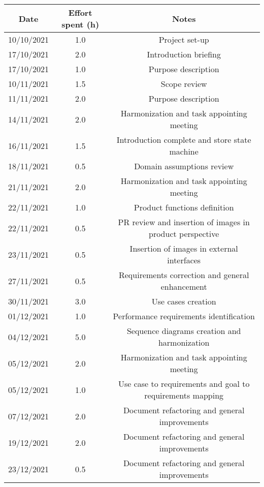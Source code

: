 \documentclass[../../main.tex]{subfiles}
\begin{document}
    \begin{center}
        \begin{tabular}{|c| |c| |c|} 
            \hline
            Date & Effort spent (h) & Notes\\ [0.5ex] 
            \hline\hline
            10/10/2021 & 1.0 & Project set-up\\ 
            17/10/2021 & 2.0 & Introduction briefing\\ 
            17/10/2021 & 1.0 & Purpose description\\ 
            10/11/2021 & 1.5 & Scope review\\
            11/11/2021 & 2.0 & Purpose description\\
            14/11/2021 & 2.0 & Harmonization and task appointing meeting\\
            16/11/2021 & 1.5 & Introduction complete and store state machine\\
            18/11/2021 & 0.5 & Domain assumptions review\\
            21/11/2021 & 2.0 & Harmonization and task appointing meeting\\
            22/11/2021 & 1.0 & Product functions definition\\
            22/11/2021 & 0.5 & PR review and insertion of images in product perspective\\
            23/11/2021 & 0.5 & Insertion of images in external interfaces\\
            27/11/2021 & 0.5 & Requirements correction and general enhancement\\
            30/11/2021 & 3.0 & Use cases creation\\
            01/12/2021 & 1.0 & Performance requirements identification\\
            04/12/2021 & 5.0 & Sequence diagrams creation and harmonization\\
            05/12/2021 & 2.0 & Harmonization and task appointing meeting\\
            05/12/2021 & 1.0 & Use case to requirements and goal to requirements mapping\\
            07/12/2021 & 2.0 & Document refactoring and general improvements\\
            19/12/2021 & 2.0 & Document refactoring and general improvements\\
            23/12/2021 & 0.5 & Document refactoring and general improvements\\
            \hline
        \end{tabular}
    \end{center}
\end{document}

